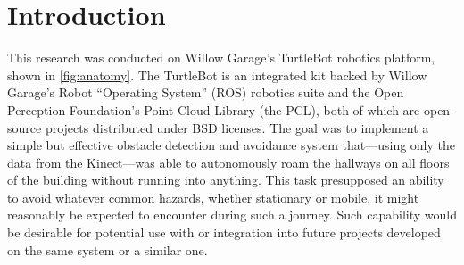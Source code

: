 \documentclass[12pt]{report}
\begin{document}
\setcounter{page}{3}
\tableofcontents
\clearpage
{}
{}
\listoffigures
\clearpage
{}
{}
\listoftables
\newpage

\section{Introduction}
This research was conducted on Willow Garage's TurtleBot robotics platform, shown in \autoref{fig:anatomy}.  The TurtleBot is an integrated kit backed by Willow Garage's Robot ``Operating System'' (ROS) robotics suite and the Open Perception Foundation's Point Cloud Library (the PCL), both of which are open-source projects distributed under BSD licenses.  The goal was to implement a simple but effective obstacle detection and avoidance system that---using only the data from the Kinect---was able to autonomously roam the hallways on all floors of the building without running into anything.  This task presupposed an ability to avoid whatever common hazards, whether stationary or mobile, it might reasonably be expected to encounter during such a journey.  Such capability would be desirable for potential use with or integration into future projects developed on the same system or a similar one.
\end{document}
